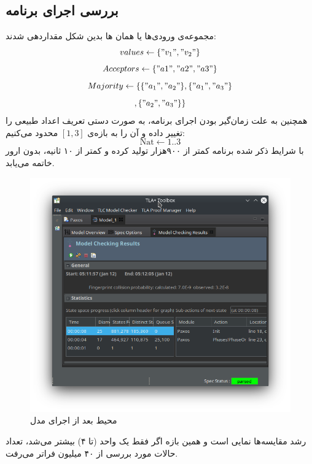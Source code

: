 \documentclass{article}
\begin{document}
\begin{multicols}{2}
\section*{
بررسی اجرای برنامه
}
مجموعه‌ی ورودی‌ها یا همان
ها بدین شکل مقداردهی شدند:
$$values \leftarrow \{"v_1", "v_2"\}$$
$$Acceptors \leftarrow \{"a1", "a2", "a3"\}$$
$$Majority \leftarrow \{\{"a_1", "a_2"\}, \{"a_1", "a_3"\}$$
$$, \{"a_2", "a_3"\}\}$$
همچنین به علت زمان‌گیر بودن اجرای برنامه، به صورت دستی
تعریف اعداد طبیعی را تغییر داده و آن را به بازه‌ی
$[1, 3]$
محدود می‌کنیم:
$$\text{Nat} \leftarrow 1 .. 3$$
با شرایط ذکر شده برنامه کمتر از ۹۰۰هزار
تولید کرده و کمتر از ۱۰ ثانیه، بدون ارور خاتمه می‌یابد.
\begin{figure}[H]
    \centering
    \includegraphics[width=0.99\linewidth]{Photos/HW6/toolbox.png}
    \caption{
    محیط
    بعد از اجرای مدل
    }
    \label{fig:my_label}
\end{figure}
رشد مقایسه‌ها نمایی است و همین بازه اگر فقط یک واحد (تا ۴) بیشتر می‌شد، تعداد حالات مورد بررسی از ۴۰ میلیون فراتر می‌رفت.
\begin{figure}[H]
    \centering

\end{figure}
\end{multicols}
\end{document}
